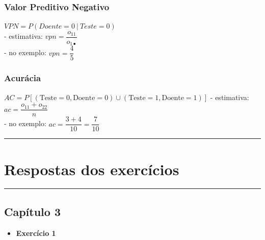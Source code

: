 \documentclass[
]{book}
\providecommand{\tightlist}{%
  \setlength{\itemsep}{0pt}\setlength{\parskip}{0pt}}
\begin{document}
\subsection{Valor Preditivo Negativo}\label{valor-preditivo-negativo}

\(VPN = P(Doente=0~|~Teste=0)\)\\
- estimativa: \(vpn = \dfrac{o_{11}}{o_{1 \bullet}}\)\\
- no exemplo: \(vpn = \dfrac{4}{5}\)

\subsection{Acurácia}\label{acuruxe1cia}

\(AC = P\left[(\text{Teste}=0, \text{Doente} = 0) \cup (\text{Teste}=1, \text{Doente} = 1)\right]\)
- estimativa: \(ac = \dfrac{o_{11}+o_{22}}{n}\)\\
- no exemplo: \(ac = \dfrac{3+4}{10} = \dfrac{7}{10}\)

\begin{center}\rule{0.5\linewidth}{0.5pt}\end{center}

\chapter{Respostas dos exercícios}\label{respostas-dos-exercuxedcios}

\begin{center}\rule{0.5\linewidth}{0.5pt}\end{center}

\section{Capítulo 3}\label{capuxedtulo-3}

\begin{itemize}
\tightlist
\item
  \textbf{Exercício 1}
\end{itemize}
\end{document}
